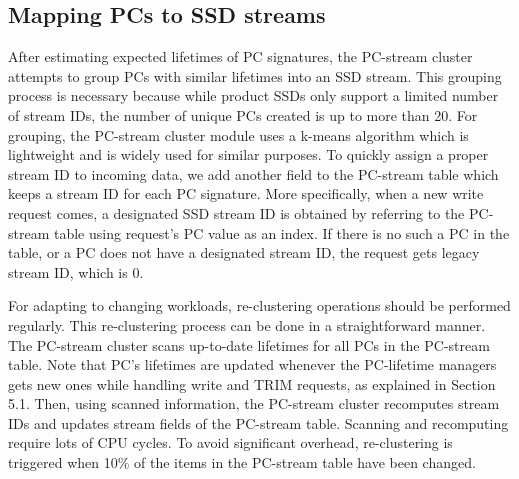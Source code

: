 
\subsection{Mapping PCs to SSD streams}

After estimating expected lifetimes of PC signatures, the PC-stream cluster
attempts to group PCs with similar lifetimes into an SSD stream.  This grouping
process is necessary because while product SSDs only support a limited number
of stream IDs, the number of unique PCs created is up to more than 20.  
For grouping, the PC-stream cluster module uses a k-means
algorithm which is lightweight and is widely used for similar purposes.  To
quickly assign a proper stream ID to incoming data, we add another field to the
PC-stream table which keeps a stream ID for each PC signature.  More
specifically, when a new write request comes, a designated SSD stream ID is
obtained by referring to the PC-stream table using request's PC value as an
index.  If there is no such a PC in the table, or a PC does not have a
designated stream ID, the request gets legacy stream ID, which is 0.

For adapting to changing workloads, re-clustering operations should be
performed regularly. This re-clustering process can be done in a
straightforward manner. The PC-stream cluster scans up-to-date lifetimes for
all PCs in the PC-stream table. Note that PC's lifetimes are updated whenever
the PC-lifetime managers gets new ones while handling write and TRIM requests,
as explained in Section 5.1.  Then, using scanned information, the PC-stream
cluster recomputes stream IDs and updates stream fields of the PC-stream table.
Scanning and recomputing require lots of CPU cycles.  To avoid significant
overhead, re-clustering is triggered when 10\% of the items in the PC-stream
table have been changed.




